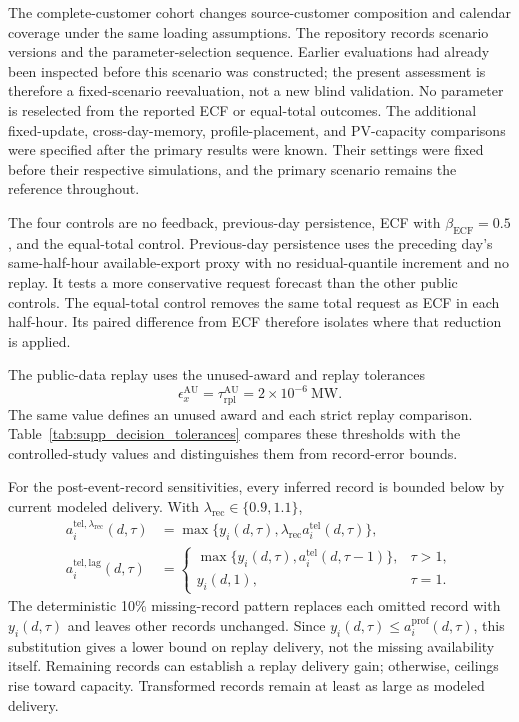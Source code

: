 \documentclass[11pt]{article}
\begin{document}
The complete-customer cohort changes source-customer composition and calendar
coverage under the same loading assumptions. The repository records scenario
versions and the parameter-selection sequence. Earlier evaluations had already
been inspected before this scenario was constructed; the present assessment
is therefore a fixed-scenario reevaluation, not a new blind validation. No
parameter is reselected from the reported ECF or equal-total outcomes.
The additional fixed-update, cross-day-memory, profile-placement, and
PV-capacity comparisons were specified after the primary results were known.
Their settings were fixed before their respective simulations, and the
primary scenario remains the reference throughout.

The four controls are no feedback, previous-day persistence, ECF with
$\beta_{\mathrm{ECF}}=0.5$, and the equal-total control.
Previous-day persistence uses the preceding day's same-half-hour
available-export proxy with no residual-quantile increment and no replay. It
tests a more conservative request forecast than the other public controls. The equal-total
control removes the same total request as ECF in each half-hour. Its paired
difference from ECF therefore isolates where that reduction is applied.

The public-data replay uses the unused-award and replay tolerances
\begin{equation}
\epsilon_x^{\mathrm{AU}}=\tau_{\mathrm{rpl}}^{\mathrm{AU}}
=2\times10^{-6}\ \mathrm{MW}.
\label{eq:supp_au_replay_tolerances}
\end{equation}
The same value defines an unused award and each strict replay comparison.
Table~\ref{tab:supp_decision_tolerances} compares these thresholds with the
controlled-study values and distinguishes them from record-error bounds.

For the post-event-record sensitivities, every inferred record is
bounded below by current modeled delivery. With
$\lambda_{\mathrm{rec}}\in\{0.9,1.1\}$,
\begin{align}
a_i^{\mathrm{tel},\lambda_{\mathrm{rec}}}(d,\tau)
&=\max\{y_i(d,\tau),\lambda_{\mathrm{rec}}a_i^{\mathrm{tel}}(d,\tau)\},\\
a_i^{\mathrm{tel,lag}}(d,\tau)
&=\begin{cases}
\max\{y_i(d,\tau),a_i^{\mathrm{tel}}(d,\tau-1)\},&\tau>1,\\
y_i(d,1),&\tau=1.
\end{cases}
\label{eq:supp_au_record_sensitivities}
\end{align}
The deterministic 10\% missing-record pattern replaces each omitted record with
$y_i(d,\tau)$ and leaves other records unchanged. Since
$y_i(d,\tau)\leq a_i^{\mathrm{prof}}(d,\tau)$, this substitution gives a lower
bound on replay delivery, not the missing availability itself. Remaining records
can establish a replay delivery gain; otherwise, ceilings rise toward capacity.
Transformed records remain at least as large as modeled delivery.
\end{document}
